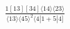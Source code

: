 \documentclass[varwidth, border=5pt]{standalone}
\begin{document}
\begin{my}
$\begin{gathered}
\scriptscriptstyle\frac{1[13][34]⟨14⟩⟨23⟩}{⟨13⟩⟨45⟩^2⟨4|1+5|4]}
\end{gathered}$
\end{my}
\end{document}
